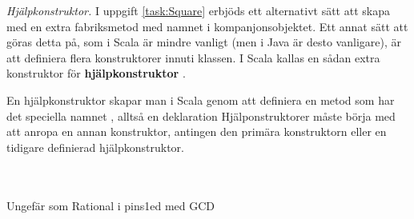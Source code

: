 \AdvancedTasks %


\Task \label{task:aux-constructor} \emph{Hjälpkonstruktor.} I uppgift \ref{task:Square} erbjöds ett alternativt sätt att skapa  med en extra fabriksmetod med namnet  i kompanjonsobjektet. Ett annat sätt att göras detta på, som i Scala är mindre vanligt (men i Java är desto vanligare), är att definiera flera konstruktorer innuti klassen. I Scala kallas en sådan extra konstruktor för \textbf{hjälpkonstruktor} . 

En hjälpkonstruktor skapar man i Scala genom att definiera en metod som har det speciella namnet , alltså en deklaration  Hjälponstruktorer måste börja med att anropa en annan konstruktor, antingen den primära konstruktorn eller en tidigare definierad  hjälpkonstruktor.  

\Subtask \TODO



\Task \TODO \\  \\
Ungefär som Rational i pins1ed med GCD
    